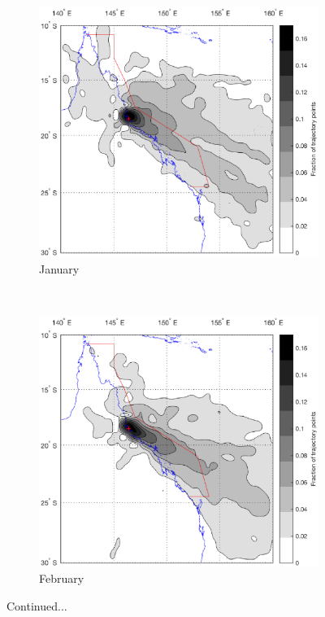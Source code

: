 \begin{figure}[!hbt]
    \centering
    \begin{subfigure}[b]{0.45\textwidth}
	    \includegraphics[width=\textwidth]{Fig/Research/BT_Coast/Map_015.eps}
	    \caption{January}
	    \label{subfig:whit}
    \end{subfigure}
    ~
    \begin{subfigure}[b]{0.45\textwidth}
    	\includegraphics[width=\textwidth]{Fig/Research/BT_Coast/Map_025.eps}
	    \caption{February}
	    \label{subfig:aims}
    \end{subfigure}
    \caption{Continued...}
    \label{fig:btcoastlucjet}
\end{figure}

